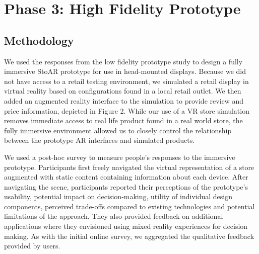 \section{Phase 3: High Fidelity Prototype}

\subsection{Methodology}
We used the responses from the low fidelity prototype study to design a fully immersive StoAR prototype for use in head-mounted displays. Because we did not have access to a retail testing environment, we simulated a retail display in virtual reality based on configurations found in a local retail outlet. We then added an augmented reality interface to the simulation to provide review and price information, depicted in Figure 2.  While our use of a VR store simulation removes immediate access to real life product found in a real world store, the fully immersive environment allowed us to closely control the relationship between the prototype AR interfaces and simulated products. %

We used a post-hoc survey to measure people's responses to the immersive prototype. Participants first freely navigated the virtual representation of a store augmented with static content containing information about each device. 
After navigating the scene, participants reported their perceptions of the prototype's usability, potential impact on decision-making, utility of individual design components, perceived trade-offs compared to existing technologies and potential limitations of the approach. They also provided feedback on additional applications where they envisioned using mixed reality experiences for decision making. As with the initial online survey, we aggregated the qualitative feedback provided by users.


